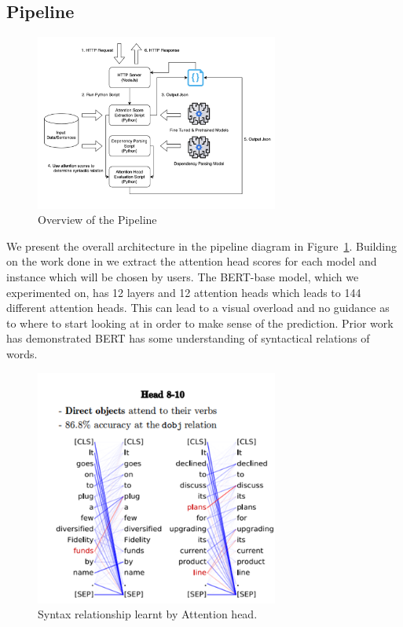 \documentclass[journal]{vgtc}                %
\begin{document}
\subsection{Pipeline}


\begin{figure}
    \centering
    
    \includegraphics[width=8cm]{figures/pipeline.png}
    \caption{Overview of the Pipeline}
    \label{fig:pipeline}
    
\end{figure}

We present the overall architecture in the pipeline diagram in Figure~\ref{fig:pipeline}. Building on the work done in \cite{clark2019does} we extract the attention head scores for each model and instance which will be chosen by users. The BERT-base model, which we experimented on, has 12 layers and 12 attention heads which leads to 144 different attention heads. This can lead to a visual overload and no guidance as to where to start looking at in order to make sense of the prediction. Prior work~\cite{clark2019does} has demonstrated BERT has some understanding of syntactical relations of words. 

\begin{figure}[h]
    \centering
    
    \includegraphics[width=8cm]{figures/syntax.png}
    \caption{Syntax relationship learnt by Attention head.}
    \label{fig:syntax}
    
\end{figure}
\end{document}
